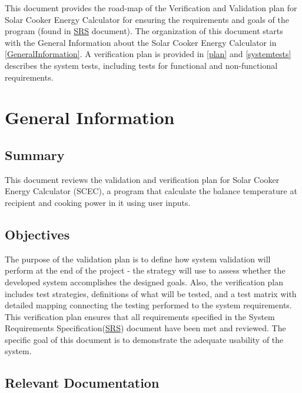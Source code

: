 \documentclass[12pt, titlepage]{article}
\begin{document}
\newpage


This document provides the road-map of the Verification and Validation plan for Solar Cooker Energy Calculator for ensuring the requirements and goals of the program (found in \href{https://github.com/DeeshaPatel/CAS-741-Solar-Cooker/blob/7c53c8d9a19ca2f94dfba6ba9208eae0bf03b8cc/docs/SRS/SRS.pdf}{SRS} document). The organization of this document starts with the General Information about the Solar Cooker Energy Calculator in \autoref{GeneralInformation}. A verification plan is provided in \autoref{plan} and \autoref{systemtests} describes the system tests, including tests for functional and non-functional requirements.
  

\section{General Information}
\label{GeneralInformation}

\subsection{Summary}

This document reviews the validation and verification plan for Solar Cooker Energy Calculator (SCEC), a program that calculate the balance temperature at recipient and cooking power in it using user inputs.  

\subsection{Objectives}

The purpose of the validation plan is to define how system validation will perform at the end of the project - the strategy will use to assess whether the developed system accomplishes the designed goals. Also, the verification plan includes test strategies, definitions of what will be tested, and a test matrix with detailed mapping connecting the testing performed to the system requirements. This verification plan ensures that all requirements specified in the System Requirements Specification(\href{https://github.com/DeeshaPatel/CAS-741-Solar-Cooker/blob/7c53c8d9a19ca2f94dfba6ba9208eae0bf03b8cc/docs/SRS/SRS.pdf}{SRS}) document have been met and reviewed. The specific goal of this document is to demonstrate the adequate usability of the system.


\subsection{Relevant Documentation}
\end{document}
